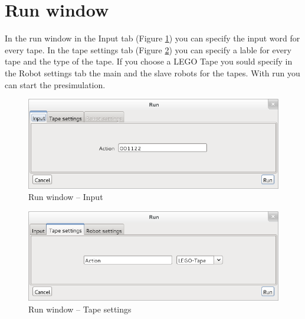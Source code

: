\documentclass[%
  a4paper,%
  11pt,%
  blue,%
  hyperref	%
  ]{tubsartcl}
\begin{document}
\newpage

\section{Run window}
In the run window in the Input tab (Figure \ref{pic:run_window_input}) you can specify the input word for every tape. In the tape settings tab (Figure \ref{pic:run_window_tape_settings}) you can specify a lable for every tape and the type of the tape. If you choose a LEGO Tape you sould specify in the Robot settings tab the main and the slave robots for the tapes. With run you can start the presimulation.
\begin{figure}[!htb]
\begin{center}
\includegraphics[scale=0.5]{graphics_gui/run_window_input.png}
\end{center}
\caption{Run window -- Input}
\label{pic:run_window_input}
\end{figure}

\newpage

\begin{figure}[!htb]
\begin{center}
\includegraphics[scale=0.5]{graphics_gui/run_window_tape_settings.png}
\end{center}
\caption{Run window -- Tape settings}
\label{pic:run_window_tape_settings}
\end{figure}

\newpage
\end{document}
